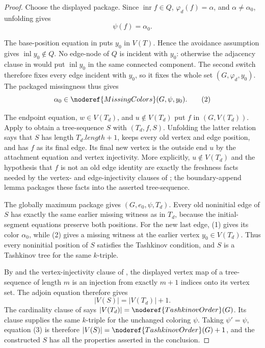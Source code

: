 \begin{proof}
Choose the displayed package.  Since
$\operatorname{inr}f\in Q$, $\varphi_d(f)=\alpha$, and
$\alpha\ne\alpha_0$, unfolding
 gives
\[
 \psi(f)=\alpha_0.                                        \tag{1}
\]

The base-position equation in 
puts $y_0$ in $V(T)$.  Hence the avoidance assumption gives
$\operatorname{inl}y_0\notin Q$.  No edge-node of $Q$ is incident with
$y_0$: otherwise the adjacency clause in
 would put $\operatorname{inl}y_0$ in
the same connected component.  The second switch therefore fixes every
edge incident with $y_0$, so it fixes the whole set
$(G,\varphi_d,y_0)$.  The packaged missingness
thus gives
\[
 \alpha_0\in\noderef{MissingColors}(G,\psi,y_0).           \tag{2}
\]

The endpoint equation, $w\in V(T_d)$, and $u\notin V(T_d)$ put $f$ in
$(G,V(T_d))$.  Apply
 to obtain a tree-sequence
$S$ with $(T_d,f,S)$.  Unfolding the
latter relation says that $S$ has length $T_d.length+1$, keeps every old
vertex and edge position, and has $f$ as its final edge.  Its final new
vertex is the outside end $u$ by the attachment equation and vertex
injectivity.  More explicitly, $u\notin V(T_d)$ and the hypothesis that
$f$ is not an old edge identity are exactly the freshness facts needed by
the vertex- and edge-injectivity clauses of ; the
boundary-append lemma packages these facts into the asserted tree-sequence.

The globally maximum package gives
$(G,e_0,\psi,T_d)$.  Every old noninitial edge of
$S$ has exactly the same earlier missing witness as in $T_d$, because
the initial-segment equations preserve both positions.  For the new last
edge, (1) gives its color $\alpha_0$, while (2) gives a missing witness at
the earlier vertex $y_0\in V(T_d)$.  Thus every noninitial position of
$S$ satisfies the Tashkinov condition, and $S$ is a Tashkinov tree for
the same $k$-triple.

By  and the vertex-injectivity clause of
, the displayed vertex map of a tree-sequence of
length $m$ is an injection from exactly $m+1$ indices onto its vertex set.
The adjoin equation therefore gives
\[
 |V(S)|=|V(T_d)|+1.                                       \tag{3}
\]
The cardinality clause of  says
$|V(T_d)|=\noderef{TashkinovOrder}(G)$.  Its
 clause supplies the same $k$-triple for the unchanged
coloring $\psi$.  Taking $\psi'=\psi$, equation (3) is therefore
$|V(S)|=\noderef{TashkinovOrder}(G)+1$, and the constructed $S$ has all
the properties asserted in the conclusion.
\end{proof}
